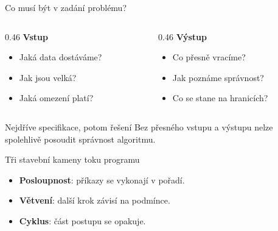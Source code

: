 \documentclass[aspectratio=169]{beamer}
\newcommand{\term}[1]{\textcolor{CodeBlue}{\textbf{#1}}}
\begin{document}
\begin{frame}{Co musí být v zadání problému?}
  \begin{columns}[T]
    \begin{column}{0.46\textwidth}
      \textbf{Vstup}
      \begin{itemize}
        \item Jaká data dostáváme?
        \item Jak jsou velká?
        \item Jaká omezení platí?
      \end{itemize}
    \end{column}
    \begin{column}{0.46\textwidth}
      \textbf{Výstup}
      \begin{itemize}
        \item Co přesně vracíme?
        \item Jak poznáme správnost?
        \item Co se stane na hranicích?
      \end{itemize}
    \end{column}
  \end{columns}
  \begin{alertblock}{Nejdříve specifikace, potom řešení}
    Bez přesného vstupu a výstupu nelze spolehlivě posoudit správnost algoritmu.
  \end{alertblock}
\end{frame}

\begin{frame}{Tři stavební kameny toku programu}
  \centering
  \vspace{7mm}
  \begin{itemize}
    \item \term{Posloupnost}: příkazy se vykonají v pořadí.
    \item \term{Větvení}: další krok závisí na podmínce.
    \item \term{Cyklus}: část postupu se opakuje.
  \end{itemize}
\end{frame}
\end{document}
